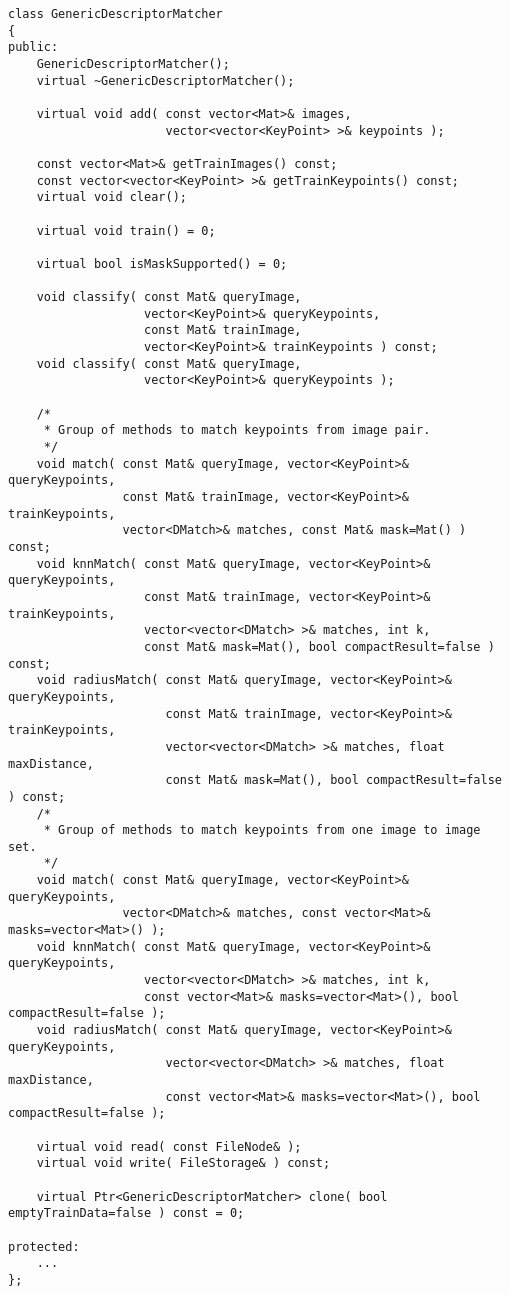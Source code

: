 \begin{lstlisting}
class GenericDescriptorMatcher
{
public:
    GenericDescriptorMatcher();
    virtual ~GenericDescriptorMatcher();

    virtual void add( const vector<Mat>& images,
                      vector<vector<KeyPoint> >& keypoints );

    const vector<Mat>& getTrainImages() const;
    const vector<vector<KeyPoint> >& getTrainKeypoints() const;
    virtual void clear();

    virtual void train() = 0;

    virtual bool isMaskSupported() = 0;

    void classify( const Mat& queryImage, 
                   vector<KeyPoint>& queryKeypoints,
                   const Mat& trainImage, 
                   vector<KeyPoint>& trainKeypoints ) const;
    void classify( const Mat& queryImage, 
                   vector<KeyPoint>& queryKeypoints );

    /*
     * Group of methods to match keypoints from image pair.
     */
    void match( const Mat& queryImage, vector<KeyPoint>& queryKeypoints,
                const Mat& trainImage, vector<KeyPoint>& trainKeypoints,
                vector<DMatch>& matches, const Mat& mask=Mat() ) const;
    void knnMatch( const Mat& queryImage, vector<KeyPoint>& queryKeypoints,
                   const Mat& trainImage, vector<KeyPoint>& trainKeypoints,
                   vector<vector<DMatch> >& matches, int k, 
                   const Mat& mask=Mat(), bool compactResult=false ) const;
    void radiusMatch( const Mat& queryImage, vector<KeyPoint>& queryKeypoints,
                      const Mat& trainImage, vector<KeyPoint>& trainKeypoints,
                      vector<vector<DMatch> >& matches, float maxDistance, 
                      const Mat& mask=Mat(), bool compactResult=false ) const;
    /*
     * Group of methods to match keypoints from one image to image set.
     */
    void match( const Mat& queryImage, vector<KeyPoint>& queryKeypoints,
                vector<DMatch>& matches, const vector<Mat>& masks=vector<Mat>() );
    void knnMatch( const Mat& queryImage, vector<KeyPoint>& queryKeypoints,
                   vector<vector<DMatch> >& matches, int k, 
                   const vector<Mat>& masks=vector<Mat>(), bool compactResult=false );
    void radiusMatch( const Mat& queryImage, vector<KeyPoint>& queryKeypoints,
                      vector<vector<DMatch> >& matches, float maxDistance, 
                      const vector<Mat>& masks=vector<Mat>(), bool compactResult=false );

    virtual void read( const FileNode& );
    virtual void write( FileStorage& ) const;
    
    virtual Ptr<GenericDescriptorMatcher> clone( bool emptyTrainData=false ) const = 0;

protected:
    ...
};
\end{lstlisting}

